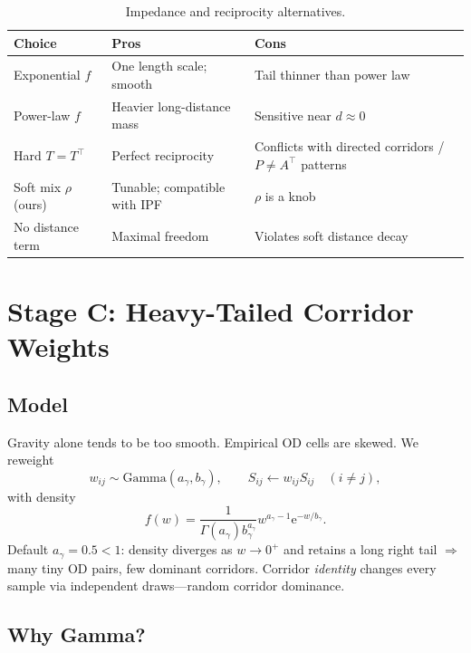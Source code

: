 \documentclass[11pt,a4paper]{report}
\begin{document}
\begin{table}[ht]
\centering
\caption{Impedance and reciprocity alternatives.}
\label{tab:fp-grav-pros}
\small
\begin{tabular}{@{}p{3.2cm}p{5.1cm}p{5.1cm}@{}}
\toprule
\textbf{Choice} & \textbf{Pros} & \textbf{Cons} \\
\midrule
Exponential $f$ &
One length scale; smooth &
Tail thinner than power law \\
Power-law $f$ &
Heavier long-distance mass &
Sensitive near $d\approx 0$ \\
Hard $T=T^\top$ &
Perfect reciprocity &
Conflicts with directed corridors / $P\neq A^\top$ patterns \\
Soft mix $\rho$ (ours) &
Tunable; compatible with IPF &
$\rho$ is a knob \\
No distance term &
Maximal freedom &
Violates soft distance decay \\
\bottomrule
\end{tabular}
\end{table}


\chapter{Stage C: Heavy-Tailed Corridor Weights}
\label{ch:fp-gamma}

\section{Model}

Gravity alone tends to be too smooth. Empirical OD cells are skewed. We reweight
\begin{equation}
  w_{ij}\sim\mathrm{Gamma}(a_\gamma,b_\gamma), \qquad
  S_{ij}\leftarrow w_{ij} S_{ij}\quad (i\neq j),
\end{equation}
with density
\begin{equation}
  f(w)=\frac{1}{\Gamma(a_\gamma)b_\gamma^{a_\gamma}} w^{a_\gamma-1}\mathrm{e}^{-w/b_\gamma}.
\end{equation}
Default $a_\gamma=0.5<1$: density diverges as $w\to 0^+$ and retains a long right tail $\Rightarrow$ many tiny OD pairs, few dominant corridors. Corridor \emph{identity} changes every sample via independent draws---random corridor dominance.

\section{Why Gamma?}
\end{document}
